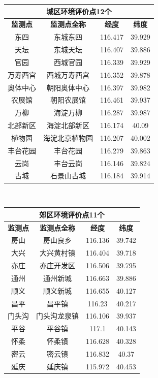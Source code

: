 ﻿\documentclass{article}
\begin{document}
\begin{CJK*}{GBK}{song}
\begin{center}
\begin{tabular}{|c|c|c|c|} \hline
\multicolumn{4}{|c|}{\textbf{城区环境评价点12个}} \\ \hline
\textbf{监测点} & \textbf{监测点全称} & \textbf{经度} & \textbf{纬度} \\ \hline
东四 & 东城东四 & 116.417 & 39.929 \\ \hline
天坛 & 东城天坛 & 116.407 & 39.886 \\ \hline
官园 & 西城官园 & 116.339 & 39.929 \\ \hline
万寿西宫 & 西城万寿西宫 & 116.352 & 39.878 \\ \hline
奥体中心 & 朝阳奥体中心 & 116.397 & 39.982 \\ \hline
农展馆 & 朝阳农展馆 & 116.461 & 39.937 \\ \hline
万柳 & 海淀万柳 & 116.287 & 39.987 \\ \hline
北部新区 & 海淀北部新区 & 116.174 & 40.09 \\ \hline
植物园 & 海淀北京植物园 & 116.207 & 40.002 \\ \hline
丰台花园 & 丰台花园 & 116.279 & 39.863 \\ \hline
云岗 & 丰台云岗 & 116.146 & 39.824 \\ \hline
古城 & 石景山古城 & 116.184 & 39.914 \\ \hline
\end{tabular}


\quad \\

\begin{tabular}{|c|c|c|c|} \hline
\multicolumn{4}{|c|}{\textbf{郊区环境评价点11个}} \\ \hline
\textbf{监测点} & \textbf{监测点全称} & \textbf{经度} & \textbf{纬度} \\ \hline
房山 & 房山良乡 & 116.136 & 39.742 \\ \hline
大兴 & 大兴黄村镇 & 116.404 & 39.718 \\ \hline
亦庄 & 亦庄开发区 & 116.506 & 39.795 \\ \hline
通州 & 通州新城 & 116.663 & 39.886 \\ \hline
顺义 & 顺义新城 & 116.655 & 40.127 \\ \hline
昌平 & 昌平镇 & 116.23 & 40.217 \\ \hline
门头沟 & 门头沟龙泉镇 & 116.106 & 39.937 \\ \hline
平谷 & 平谷镇 & 117.1 & 40.143 \\ \hline
怀柔 & 怀柔镇 & 116.628 & 40.328 \\ \hline
密云 & 密云镇 & 116.832 & 40.37 \\ \hline
延庆 & 延庆镇 & 115.972 & 40.453 \\ \hline
\end{tabular}


\end{center}
\end{CJK*}
\end{document}

